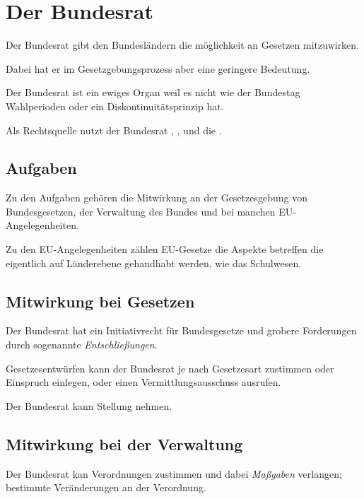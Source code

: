 \documentclass{article}
\begin{document}
\section{Der Bundesrat} 
Der Bundesrat gibt den Bundesländern die möglichkeit an Gesetzen \uae mitzuwirken.

Dabei hat er im Gesetzgebungsprozess aber eine geringere Bedeutung.

Der Bundesrat ist ein ewiges Organ weil es nicht wie der Bundestag Wahlperioden oder ein Diskontinuitätsprinzip hat.

Als Rechtsquelle nutzt der Bundesrat  \GG,  \GG,  und die \GOBR.

\subsection{Aufgaben}
Zu den Aufgaben gehören die Mitwirkung an der Gesetzesgebung von Bundesgesetzen, der Verwaltung des Bundes und bei manchen EU-Angelegenheiten.

Zu den EU-Angelegenheiten zählen EU-Gesetze die Aspekte betreffen die eigentlich auf Länderebene gehandhabt werden, wie das Schulwesen.

\subsection{Mitwirkung bei Gesetzen}
Der Bundesrat hat ein Initiativrecht für Bundesgesetze und grobere Forderungen durch sogenannte \emph{Entschließungen}.

Gesetzesentwürfen kann der Bundesrat je nach Gesetzesart zustimmen oder Einspruch einlegen, oder einen Vermittlungsausschuss ausrufen.

Der Bundesrat kann Stellung nehmen.

\subsection{Mitwirkung bei der Verwaltung}
Der Bundesrat kan Verordnungen \uae zustimmen und dabei \sog \emph{Maßgaben} verlangen; bestimmte Veränderungen an der Verordnung.
\end{document}

